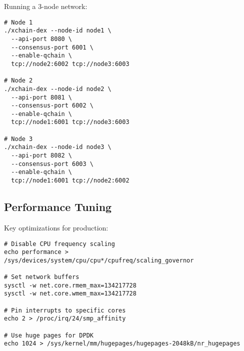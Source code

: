 \documentclass[11pt,a4paper]{article}
\begin{document}
Running a 3-node network:

\begin{lstlisting}
# Node 1
./xchain-dex --node-id node1 \
  --api-port 8080 \
  --consensus-port 6001 \
  --enable-qchain \
  tcp://node2:6002 tcp://node3:6003

# Node 2
./xchain-dex --node-id node2 \
  --api-port 8081 \
  --consensus-port 6002 \
  --enable-qchain \
  tcp://node1:6001 tcp://node3:6003

# Node 3
./xchain-dex --node-id node3 \
  --api-port 8082 \
  --consensus-port 6003 \
  --enable-qchain \
  tcp://node1:6001 tcp://node2:6002
\end{lstlisting}

\subsection{Performance Tuning}

Key optimizations for production:

\begin{lstlisting}
# Disable CPU frequency scaling
echo performance > /sys/devices/system/cpu/cpu*/cpufreq/scaling_governor

# Set network buffers
sysctl -w net.core.rmem_max=134217728
sysctl -w net.core.wmem_max=134217728

# Pin interrupts to specific cores
echo 2 > /proc/irq/24/smp_affinity

# Use huge pages for DPDK
echo 1024 > /sys/kernel/mm/hugepages/hugepages-2048kB/nr_hugepages
\end{lstlisting}
\end{document}
